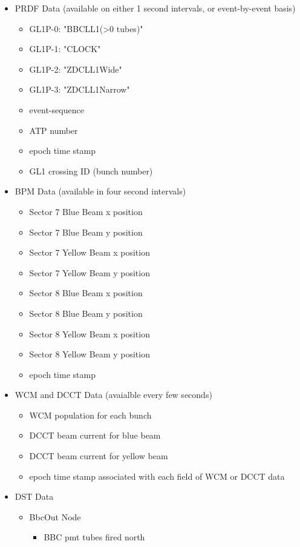 \begin{itemize}
\item PRDF Data (available on either 1 second intervals, or event-by-event basis)
  \begin{itemize}
  \item GL1P-0: "BBCLL1(\textgreater0 tubes)"
  \item GL1P-1: "CLOCK"
  \item GL1P-2: "ZDCLL1Wide"
  \item GL1P-3: "ZDCLL1Narrow"
  \item event-sequence
  \item ATP number
  \item epoch time stamp
  \item GL1 crossing ID (bunch number)
  \end{itemize}
\item BPM Data (available in four second intervals)
  \begin{itemize}
  \item Sector 7 Blue Beam x position
  \item Sector 7 Blue Beam y position
  \item Sector 7 Yellow Beam x position
  \item Sector 7 Yellow Beam y position
  \item Sector 8 Blue Beam x position
  \item Sector 8 Blue Beam y position
  \item Sector 8 Yellow Beam x position
  \item Sector 8 Yellow Beam y position
  \item epoch time stamp
  \end{itemize}
\item WCM and DCCT Data (avaialble every few seconds)
  \begin{itemize}
  \item WCM population for each bunch
  \item DCCT beam current for blue beam
  \item DCCT beam current for yellow beam
  \item epoch time stamp associated with each field of WCM or DCCT data
  \end{itemize}
\item DST Data
  \begin{itemize}
  \item BbcOut Node
    \begin{itemize}
      \item BBC pmt tubes fired north

\end{itemize}
\end{itemize}
\end{itemize}
